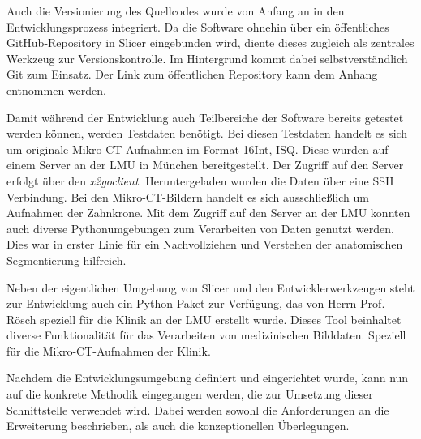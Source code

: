 Auch die Versionierung des Quellcodes wurde von Anfang an in den Entwicklungsprozess
integriert. Da die Software ohnehin über ein öffentliches GitHub-Repository in
Slicer eingebunden wird, diente dieses zugleich als zentrales Werkzeug zur Versionskontrolle.
Im Hintergrund kommt dabei selbstverständlich Git zum Einsatz. Der Link zum öffentlichen
Repository kann dem Anhang entnommen werden.

Damit während der Entwicklung auch Teilbereiche der Software bereits getestet werden
können, werden Testdaten benötigt. Bei diesen Testdaten handelt es sich um originale
Mikro-\ac{CT}-Aufnahmen im Format \ac{16Int}, \ac{ISQ}. Diese wurden auf einem
Server an der \ac{LMU} in München bereitgestellt. Der Zugriff auf den Server
erfolgt über den \textit{x2goclient}. Heruntergeladen wurden die Daten über eine
\ac{SSH} Verbindung. Bei den Mikro-\ac{CT}-Bildern handelt es sich ausschließlich
um Aufnahmen der Zahnkrone. Mit dem Zugriff auf den Server an der \ac{LMU} konnten
auch diverse Pythonumgebungen zum Verarbeiten von Daten genutzt werden. Dies war
in erster Linie für ein Nachvollziehen und Verstehen der anatomischen
Segmentierung hilfreich.

Neben der eigentlichen Umgebung von Slicer und den Entwicklerwerkzeugen steht
zur Entwicklung auch ein Python Paket zur Verfügung, das von Herrn Prof. Rösch
speziell für die Klinik an der \ac{LMU} erstellt wurde. Dieses Tool beinhaltet
diverse Funktionalität für das Verarbeiten von medizinischen Bilddaten. Speziell
für die Mikro-\ac{CT}-Aufnahmen der Klinik.

Nachdem die Entwicklungsumgebung definiert und eingerichtet wurde, kann nun auf die
konkrete Methodik eingegangen werden, die zur Umsetzung dieser Schnittstelle
verwendet wird. Dabei werden sowohl die Anforderungen an die Erweiterung beschrieben,
als auch die konzeptionellen Überlegungen.

